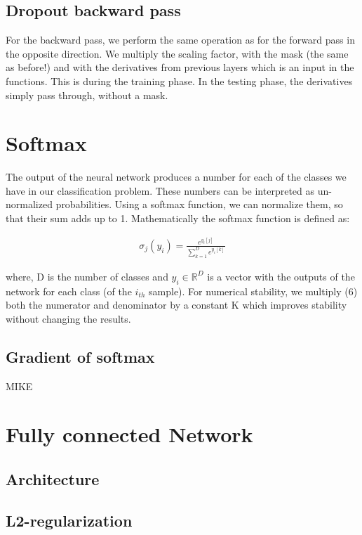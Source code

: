 \documentclass[12pt,twoside]{article}
\begin{document}
\subsection{Dropout backward pass}

For the backward pass, we perform the same operation as for the forward pass in the opposite direction. We multiply the scaling factor, with the mask (the same as before!) and with the derivatives from previous layers which is an input in the functions. This is during the training phase. In the testing phase, the derivatives simply pass through, without a mask. 



\section{Softmax}

The output of the neural network produces a number for each of the classes we have in our classification problem. These numbers can be interpreted as un-normalized probabilities. Using a softmax function, we can normalize them, so that their sum adds up to 1.
Mathematically the softmax function is defined as:

\begin{align}
\sigma_j (y_i) = \frac{e^{y_i[j]}}{\sum_{k=1}^{D} e^{y_i[k]}}
\end{align}

where, D is the number of classes and $y_i \in \mathbb{R}^D$ is a vector with the outputs of the network for each class (of the $i_{th}$ sample). For numerical stability, we multiply (6) both the numerator and denominator by a constant K which improves stability without changing the results.



\subsection{Gradient of softmax}
MIKE
\section{Fully connected Network}
\subsection{Architecture}
\subsection{L2-regularization}
\end{document}
